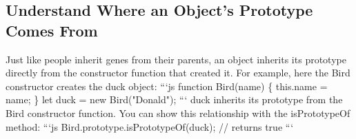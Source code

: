 \documentclass{article}%
\begin{document}
\subsection{Understand Where an Object’s Prototype Comes From}%
\label{subsec:UnderstandWhereanObjectsPrototypeComesFrom}%
Just like people inherit genes from their parents, an object inherits its prototype directly from the constructor function that created it. For example, here the Bird constructor creates the duck object:\newline%
```js\newline%
function Bird(name) \{\newline%
  this.name = name;\newline%
\}\newline%
let duck = new Bird("Donald");\newline%
```\newline%
duck inherits its prototype from the Bird constructor function. You can show this relationship with the isPrototypeOf method:\newline%
```js\newline%
Bird.prototype.isPrototypeOf(duck);\newline%
// returns true\newline%
```\newline%

%
\end{document}
